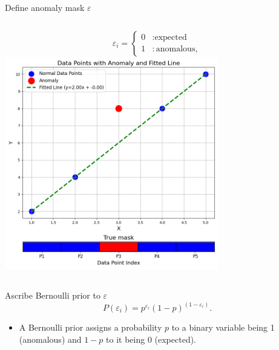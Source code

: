 \documentclass[aspectratio=169]{beamer}
\begin{document}
\begin{frame}{Define anomaly mask $\varepsilon$}
  \begin{columns}
      \footnotesize
      \begin{equation}
          \varepsilon_i = \begin{cases}
              0 &: \text{expected}\\
              1 &: \text{anomalous},
          \end{cases}
      \end{equation}
      \centering
      \includegraphics[width=0.7\textwidth]{images/generated_plot.png} %
  \end{columns}
\end{frame}

\begin{frame}{Ascribe Bernoulli prior to $\varepsilon$}
  \footnotesize
  \begin{equation}
      P(\varepsilon_i) = p^{\varepsilon_i}(1-p)^{(1-\varepsilon_i)}.
  \end{equation}
  \begin{itemize}
    \item A Bernoulli prior assigns a probability $p$ to a binary variable being 1 (anomalous) and $1-p$ to it being 0 (expected).
  \end{itemize}
\end{frame}
\end{document}
